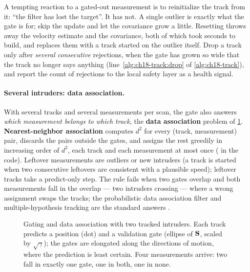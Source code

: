 \begin{pitfall}
A tempting reaction to a gated-out measurement is to reinitialize the track
from it: ``the filter has lost the target''. It has not. A single outlier is
exactly what the gate is for; skip the update and let the covariance grow a
little. Resetting throws away the velocity estimate and the covariance, both
of which took seconds to build, and replaces them with a track started on the
outlier itself. Drop a track only after \emph{several consecutive}
rejections, when the gate has grown so wide that the track no longer says
anything (line~\ref{alg:ch18-track:drop} of \cref{alg:ch18-track}), and
report the count of rejections to the local safety layer as a health signal.
\end{pitfall}

\paragraph{Several intruders: data association.}
With several tracks and several measurements per scan, the gate also answers
\emph{which measurement belongs to which track}, the \textbf{data
association} problem of \cref{fig:ch18-gating}.
\textbf{Nearest-neighbor association}
computes $d^2$ for every (track, measurement) pair, discards the pairs
outside the gates, and assigns the rest greedily in increasing order of
$d^2$, each track and each measurement at most once
( in the code). Leftover measurements
are outliers or new intruders (a track is started when two consecutive
leftovers are consistent with a plausible speed); leftover tracks take a
predict-only step. The rule fails when two gates overlap and both
measurements fall in the overlap --- two intruders crossing --- where a wrong
assignment swaps the tracks; the probabilistic data association filter and
multiple-hypothesis tracking are the standard answers
\cite{barshalom2001estimation}.

\begin{figure}[tb]
  \centering
  \caption{Gating and data association with two tracked intruders. Each
  track predicts a position (dot) and a validation gate (ellipse of
  $\mathbf{S}$, scaled by $\sqrt\gamma$); the gates are elongated along the
  directions of motion, where the prediction is least certain. Four
  measurements arrive: two fall in exactly one gate, one in both, one in
  none.}
  \label{fig:ch18-gating}
\end{figure}

